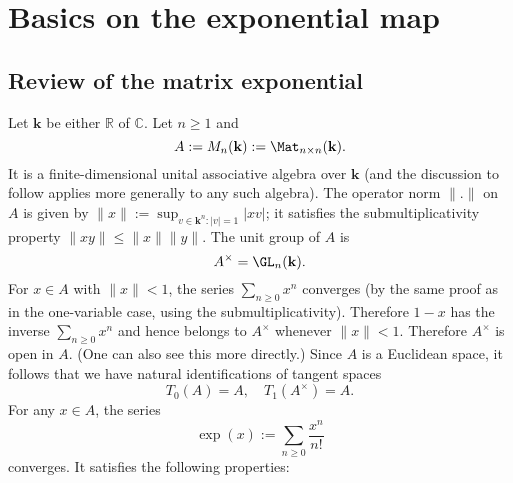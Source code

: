 \documentclass[reqno]{amsart} 
\begin{document}
\section{Basics on the exponential map\label{sec:exp-map}}
\label{sec:org77618cc}
\subsection{Review of the matrix exponential\label{sec:matrix-exp}}
\label{sec:orgd602cac}
Let $\mathbf{k}$ be either $\mathbb{R}$ of $\mathbb{C}$.
Let $n \geq 1$
and
\begin{equation*}
  A := M_n(\mathbf{k}) := \Mat_{n \times n}(\mathbf{k}).
\end{equation*}
It is a finite-dimensional unital associative algebra over
$\mathbf{k}$ (and the discussion to follow applies more generally to any such algebra).
The operator norm $\|.\|$ on $A$ is given by
$\|x\| := \sup_{v \in \mathbf{k}^n : |v| = 1} |x v|$;
it satisfies the submultiplicativity property $\|x y\| \leq \|x\| \|y\|$.
The unit group of $A$ is
\begin{equation*}
  A^\times = \GL_n(\mathbf{k}).
\end{equation*}
For $x \in A$ with $\|x\| < 1$, the series
$\sum_{n \geq 0} x^n$ converges (by the same proof
as in the one-variable case, using the submultiplicativity).
Therefore $1 - x$ has the inverse $\sum_{n \geq 0} x^n$
and hence belongs to $A^\times$ whenever $\|x\| < 1$.
Therefore $A^\times$ is open in $A$.
(One can also see this more directly.)
Since $A$ is a Euclidean space,
it follows that we have natural identifications of tangent
spaces
\begin{equation*}
  T_0(A) = A,
  \quad
  T_1(A^\times) = A.
\end{equation*}
For any $x \in A$, the series
\begin{equation*}
  \exp(x) := \sum_{n \geq 0} \frac{x^n}{n!}
\end{equation*}
converges.
It satisfies the following properties:
\end{document}
